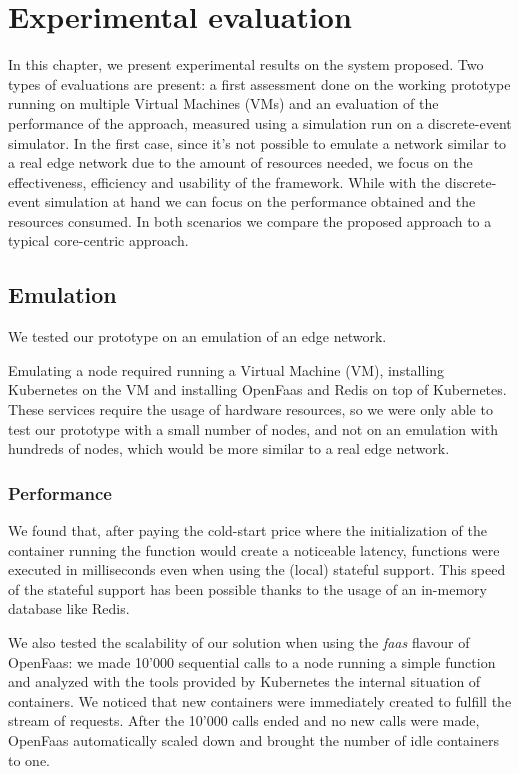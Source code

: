 \chapter{Experimental evaluation}
\label{ch:evaluation}

In this chapter, we present experimental results on the system proposed. Two types of evaluations are present: a first assessment done on the working prototype running on multiple Virtual Machines (VMs) and an evaluation of the performance of the approach, measured using a simulation run on a discrete-event simulator.
In the first case, since it's not possible to emulate a network similar to a real edge network due to the amount of resources needed, we focus on the effectiveness, efficiency and usability of the framework.
While with the discrete-event simulation at hand we can focus on the performance obtained and the resources consumed.
In both scenarios we compare the proposed approach to a typical core-centric approach.



\section{Emulation}
We tested our prototype on an emulation of an edge network.

Emulating a node required running a Virtual Machine (VM), installing Kubernetes on the VM and installing OpenFaas and Redis on top of Kubernetes.
These services require the usage of hardware resources, so we were only able to test our prototype with a small number of nodes, and not on an emulation with hundreds of nodes, which would be more similar to a real edge network.


\subsection{Performance}
We found that, after paying the cold-start price where the initialization of the container running the function would create a noticeable latency, functions were executed in milliseconds even when using the (local) stateful support. This speed of the stateful support has been possible thanks to the usage of an in-memory database like Redis.

We also tested the scalability of our solution when using the \textit{faas} flavour of OpenFaas: we made 10'000 sequential calls to a node running a simple function and analyzed with the tools provided by Kubernetes the internal situation of containers. We noticed that new containers were immediately created to fulfill the stream of requests. After the 10'000 calls ended and no new calls were made, OpenFaas automatically scaled down and brought the number of idle containers to one.


